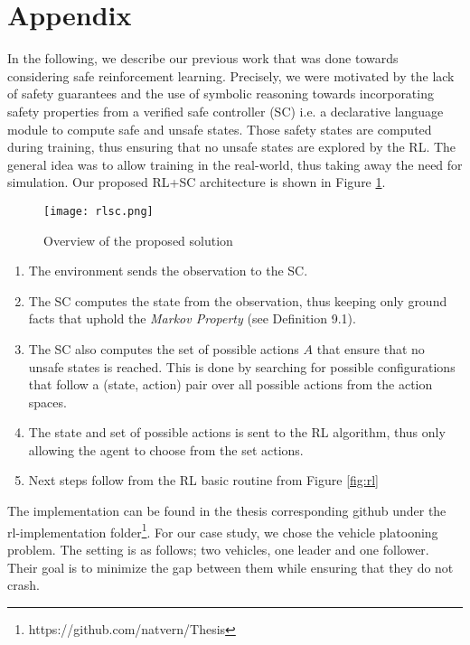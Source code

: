 \section{Appendix}

In the following, we describe our previous work that was done towards considering safe reinforcement learning. 
Precisely, we were motivated by the lack of safety guarantees and the use of symbolic reasoning towards incorporating 
safety properties from a verified safe controller (SC) i.e. a declarative language module to compute safe and unsafe states. 
Those safety states are computed during training, thus ensuring that no unsafe states are explored 
by the RL. The general idea was to allow training in the real-world, thus taking away the need for simulation. Our proposed RL+SC architecture is shown in Figure \ref{fig:rlsc}.


\begin{figure}[H]
  \centering
  \texttt{[image: rlsc.png]}
  \caption{Overview of the proposed solution}
  \label{fig:rlsc}
\end{figure}

\begin{enumerate}
  \item The environment sends the observation to the SC. 
  \item The SC computes the state from the observation, thus keeping only 
        ground facts that uphold the \emph{Markov Property} (see Definition 9.1). 
  \item The SC also computes the set of possible actions $A$ that ensure that no unsafe states is 
        reached. This is done by searching for possible configurations that follow a (state, action) pair over 
        all possible actions from the action spaces. 
  \item The state and set of possible actions is sent to the RL algorithm, thus only allowing 
        the agent to choose from the set actions. 
  \item Next steps follow from the RL basic routine from Figure \ref{fig:rl}
\end{enumerate}

The implementation can be found in the thesis corresponding github under the rl-implementation folder\footnote{https://github.com/natvern/Thesis}.
For our case study, we chose the vehicle platooning problem. The setting is as follows; two vehicles, one leader and one follower. Their goal is to 
minimize the gap between them while ensuring that they do not crash. 

